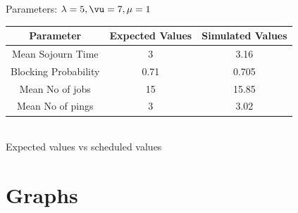 \documentclass[10pt]{article}
\begin{document}
Parameters: $\lambda = 5, \vu = 7,\mu =1 $
\begin{center}
    
\begin{table}[htbp]
    \centering
    \begin{tabular}{|c|c|c|}
        \hline
        Parameter & Expected Values & Simulated Values  \\
        \hline
        Mean Sojourn Time & 3 & 3.16 \\
        Blocking Probability & 0.71 & 0.705 \\
        Mean No of jobs & 15 & 15.85 \\
        Mean No of pings & 3 & 3.02 \\
        \hline
    \end{tabular}
    \label{tab:comparison} \\
    Expected values vs scheduled values
\end{table}
\end{center}

\section{Graphs}
\end{document}

